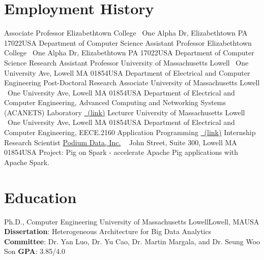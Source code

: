 \documentclass[11pt]{moderncv}
\begin{document}
\section{Employment History}
%
        {Associate Professor}%
        {\small Elizabethtown College}%
        {\small ~\hfill\break One Alpha Dr, Elizabethtown PA 17022}{USA}%
        {Department of Computer Science}
%
%
        {Assistant Professor}%
        {\small Elizabethtown College}%
        {\small ~\hfill\break One Alpha Dr, Elizabethtown PA 17022}{USA}%
        {Department of Computer Science}
%
%
        {Research Assistant Professor}%
        {\small University of Massachusetts Lowell}%
        {\small ~\hfill\break One University Ave, Lowell MA 01854}{USA}%
        {Department of Electrical and Computer Engineering}
%
%
        {Post-Doctoral Research Associate}%
        {\small University of Massachusetts Lowell}%
        {\small ~\hfill\break One University Ave, Lowell MA 01854}{USA}%
        {Department of Electrical and Computer Engineering, \newline
         Advanced Computing and Networking Systems (ACANETS) Laboratory \href{http://acanets.uml.edu/}{\color{color2}\homepagesymbol~(link)}
        }
%
%
        {Lecturer}%
        {\small University of Massachusetts Lowell}%
        {\small ~\hfill\break One University Ave, Lowell MA 01854}{USA}%
        {Department of Electrical and Computer Engineering, \newline
         EECE.2160 Application Programming \href{http://mjgeiger.github.io/eece2160/}{\color{color2}\homepagesymbol~(link)}
        }
%
%
        {Internship Research Scientist}%
        {\small \href{http://www.podiumdata.com/}{Podium Data, Inc.}}%
        {\small ~\hfill{} John Street, Suite 300, Lowell MA 01854}{USA}%
        {Project: Pig on Spark - accelerate Apache Pig applications with Apache Spark.
        }
%

\pagebreak

\section{Education}
        {Ph.D., Computer Engineering}
        {University of Massachusetts Lowell}{Lowell, MA}{USA}
        {\textbf{Dissertation}: Heterogeneous Architecture for Big Data Analytics\\
         \textbf{Committee}: Dr. Yan Luo, Dr. Yu Cao, Dr. Martin Margala, and Dr. Seung Woo Son
         \textbf{GPA}: 3.85/4.0}  %
\end{document}
